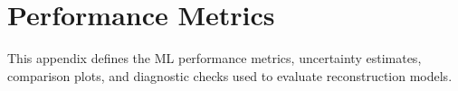\section{Performance Metrics}

This appendix defines the ML performance metrics, uncertainty estimates,
comparison plots, and diagnostic checks used to evaluate reconstruction models.

